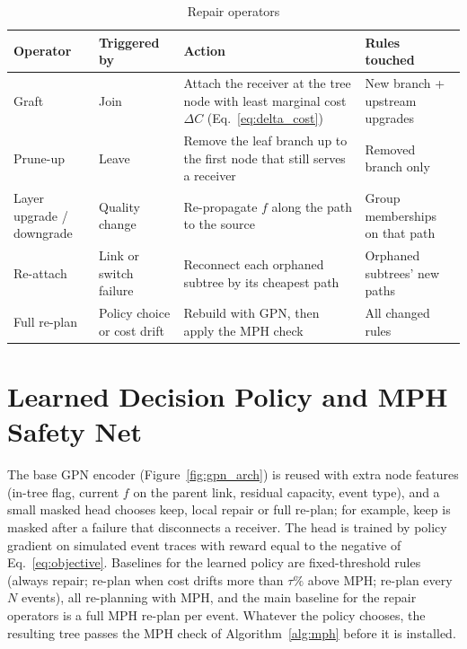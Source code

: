 \begin{table}[!htb]
\caption{Repair operators}
\label{tab:operators}
\begin{center}
\footnotesize
\renewcommand{\arraystretch}{1.1}
\begin{tabular}{|L{2.4cm}|L{2.4cm}|L{6.2cm}|L{3.2cm}|}
\hline
\textbf{Operator} & \textbf{Triggered by} & \textbf{Action} & \textbf{Rules touched} \\
\hline\hline
Graft & Join & Attach the receiver at the tree node with least marginal cost $\Delta C$ (Eq.~\ref{eq:delta_cost}) & New branch + upstream upgrades \\ \hline
Prune-up & Leave & Remove the leaf branch up to the first node that still serves a receiver & Removed branch only \\ \hline
Layer upgrade / downgrade & Quality change & Re-propagate $f$ along the path to the source & Group memberships on that path \\ \hline
Re-attach & Link or switch failure & Reconnect each orphaned subtree by its cheapest path & Orphaned subtrees' new paths \\ \hline
Full re-plan & Policy choice or cost drift & Rebuild with GPN, then apply the MPH check & All changed rules \\
\hline
\end{tabular}
\end{center}
\end{table}

\section{Learned Decision Policy and MPH Safety Net}\label{sec:m_policy}
\noindent The base GPN encoder (Figure~\ref{fig:gpn_arch}) is reused with extra node features (in-tree flag, current $f$ on the parent link, residual capacity, event type), and a small masked head chooses keep, local repair or full re-plan; for example, keep is masked after a failure that disconnects a receiver. The head is trained by policy gradient on simulated event traces with reward equal to the negative of Eq.~\eqref{eq:objective}. Baselines for the learned policy are fixed-threshold rules (always repair; re-plan when cost drifts more than $\tau\%$ above MPH; re-plan every $N$ events), all re-planning with MPH, and the main baseline for the repair operators is a full MPH re-plan per event. Whatever the policy chooses, the resulting tree passes the MPH check of Algorithm~\ref{alg:mph} before it is installed.

